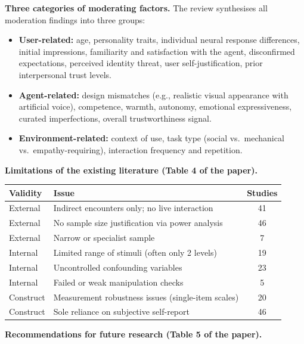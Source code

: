 \documentclass[11pt, a4paper]{article}
\begin{document}
\textbf{Three categories of moderating factors.} The review synthesises all moderation findings into three groups:

\begin{itemize}[leftmargin=2em]
  \item \textbf{User-related:} age, personality traits, individual neural response differences, initial impressions, familiarity and satisfaction with the agent, disconfirmed expectations, perceived identity threat, user self-justification, prior interpersonal trust levels.
  \item \textbf{Agent-related:} design mismatches (e.g., realistic visual appearance with artificial voice), competence, warmth, autonomy, emotional expressiveness, curated imperfections, overall trustworthiness signal.
  \item \textbf{Environment-related:} context of use, task type (social vs.\ mechanical vs.\ empathy-requiring), interaction frequency and repetition.
\end{itemize}

\textbf{Limitations of the existing literature (Table 4 of the paper).}

\begin{center}
\begin{tabular}{p{2.2cm}p{7cm}c}
\toprule
\textbf{Validity} & \textbf{Issue} & \textbf{Studies} \\
\midrule
External & Indirect encounters only; no live interaction & 41 \\
External & No sample size justification via power analysis & 46 \\
External & Narrow or specialist sample & 7 \\
Internal & Limited range of stimuli (often only 2 levels) & 19 \\
Internal & Uncontrolled confounding variables & 23 \\
Internal & Failed or weak manipulation checks & 5 \\
Construct & Measurement robustness issues (single-item scales) & 20 \\
Construct & Sole reliance on subjective self-report & 46 \\
\bottomrule
\end{tabular}
\end{center}

\textbf{Recommendations for future research (Table 5 of the paper).}
\end{document}
